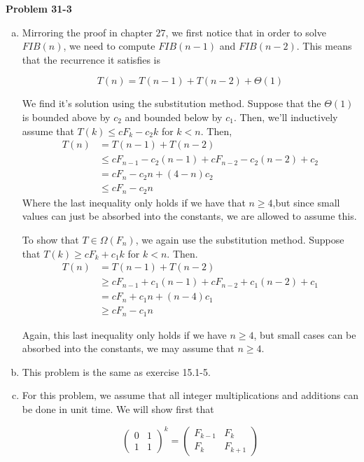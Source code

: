 \documentclass{article}
\begin{document}
\noindent\textbf{Problem 31-3}\\

\begin{enumerate}[a.]
\item
Mirroring the proof in chapter $27$, we first notice that in order to solve $FIB(n)$, we need to compute $FIB(n-1)$ and $FIB(n-2)$. This means that the recurrence it satisfies is

\[
T(n) = T(n-1) + T(n-2) + \Theta(1)
\]

We find it's solution using the substitution method. Suppose that the $\Theta(1)$ is bounded above by $c_2$ and bounded below by $c_1$. Then, we'll inductively assume that $T(k) \le cF_k - c_2k$ for $k<n$. Then,
\begin{align*}
T(n) &= T(n-1) + T(n-2) \\
&\le cF_{n-1} - c_2(n-1) + cF_{n-2} - c_2(n-2) + c_2\\
&= cF_n -c_2 n + (4 -n) c_2\\
&\le cF_n -c_2 n
\end{align*}
Where the last inequality only holds if we have that $n\ge 4$,but since small values can just be absorbed into the constants, we are allowed to assume this.

To show that $T\in \Omega(F_n)$, we again use the substitution method. Suppose that $T(k) \ge c F_k + c_1 k$ for $k<n$. Then.
\begin{align*}
T(n) &= T(n-1) + T(n-2) \\
&\ge cF_{n-1} + c_1(n-1) + cF_{n-2} + c_1(n-2) + c_1\\
&= cF_n +c_1 n + (n-4) c_1\\
&\ge cF_n -c_1 n
\end{align*}

Again, this last inequality only holds if we have $n\ge 4$, but small cases can be absorbed into the constants, we may assume that $n\ge 4$.

\item
This problem is the same as exercise 15.1-5.
\item
For this problem, we assume that all integer multiplications and additions can be done in unit time. We will show first that

\[
\left( \begin{array}{cc}0&1\\1&1\end{array}\right)^k = \left( \begin{array}{cc}F_{k-1}&F_{k}\\F_{k}&F_{k+1}\end{array}\right)
\]


\end{enumerate}
\end{document}

